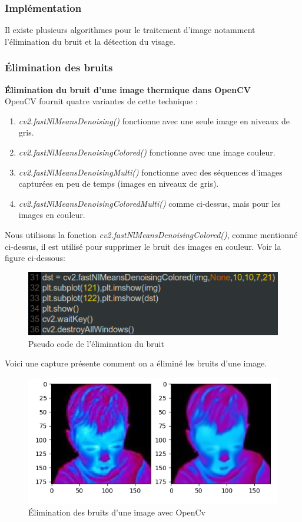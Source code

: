 \documentclass[12pt]{article}
\begin{document}
\subsubsection{Implémentation}
Il existe plusieurs algorithmes pour le traitement d'image notamment l'élimination du bruit et la détection du visage.
\subsubsection*{\' Elimination des bruits}
\textbf{Élimination du bruit  d'une image thermique dans OpenCV}\\

OpenCV fournit quatre variantes de cette technique :
\begin{enumerate}
	\item \textit{cv2.fastNlMeansDenoising()} fonctionne avec une seule image en niveaux de gris.
	\item \textit{cv2.fastNlMeansDenoisingColored()} fonctionne avec une image couleur.
	\item \textit{cv2.fastNlMeansDenoisingMulti()} fonctionne avec des séquences d'images capturées en peu de temps (images en niveaux de gris).
	\item \textit{cv2.fastNlMeansDenoisingColoredMulti()} comme ci-dessus, mais pour les images en couleur.
\end{enumerate}

Nous utilisons la fonction \textit{cv2.fastNlMeansDenoisingColored()}, comme mentionné ci-dessus, il est utilisé pour supprimer le bruit des images en couleur. Voir la figure ci-dessous:
\newpage
\begin{figure}[h]
	\centering
	\includegraphics[width=15cm]{img-Chapiter-4/elimination.png}
	\caption{Pseudo code de l'élimination du bruit}
\end{figure}

Voici une capture présente comment on a éliminé les bruits d'une image.
\begin{figure}[h]
	\centering
	\includegraphics[width=14cm]{img-Chapiter-4/elicapture.png}
	\caption{\' Elimination des bruits d'une image avec OpenCv}
\end{figure}
\end{document}
